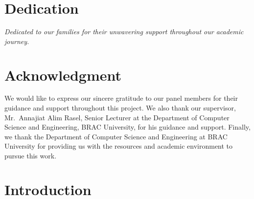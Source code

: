 \documentclass[12pt, a4paper]{report}
\begin{document}
\newpage
\thispagestyle{empty}

\chapter*{Dedication}
{}

\vspace{3cm}
\begin{center}
\textit{Dedicated to our families for their unwavering support throughout our academic journey.}
\end{center}

\newpage
\thispagestyle{empty}

\chapter*{Acknowledgment}
{}

We would like to express our sincere gratitude to our panel members for their guidance and support throughout this project. We also thank our supervisor, Mr.\ Annajiat Alim Rasel, Senior Lecturer at the Department of Computer Science and Engineering, BRAC University, for his guidance and support. Finally, we thank the Department of Computer Science and Engineering at BRAC University for providing us with the resources and academic environment to pursue this work.

\newpage
\singlespacing
\setcounter{page}{1}
\tableofcontents
\newpage
\listoffigures
\newpage
{}
\setcounter{page}{1}

\chapter{Introduction}
\label{sec:intro}
\end{document}
